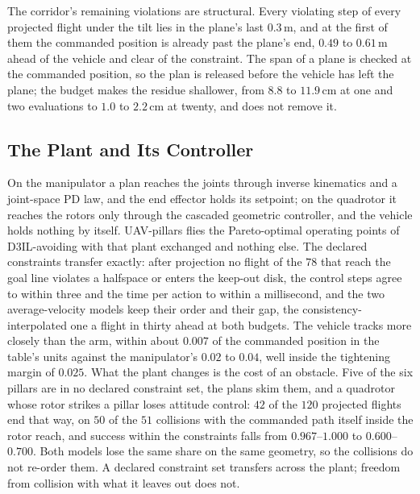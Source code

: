The corridor's remaining violations are structural. Every violating step of every projected flight
under the tilt lies in the plane's last $0.3$\,m, and at the first of them the commanded position is
already past the plane's end, $0.49$ to $0.61$\,m ahead of the vehicle and clear of the constraint. The
span of a plane is checked at the commanded position, so the plan is released before the vehicle has
left the plane; the budget makes the residue shallower, from $8.8$ to $11.9$\,cm at one and two
evaluations to $1.0$ to $2.2$\,cm at twenty, and does not remove it.

\subsection{The Plant and Its Controller}\label{sec:disc:plant}

On the manipulator a plan reaches the joints through inverse kinematics and a joint-space PD law, and
the end effector holds its setpoint; on the quadrotor it reaches the rotors only through the cascaded
geometric controller, and the vehicle holds nothing by itself. UAV-pillars flies the Pareto-optimal
operating points of D3IL-avoiding with that plant exchanged and nothing else. The declared constraints
transfer exactly: after projection no flight of the $78$ that reach the goal line violates a halfspace
or enters the keep-out disk, the control steps agree to within three and the time per action to within
a millisecond, and the two average-velocity models keep their order and their gap, the
consistency-interpolated one a flight in thirty ahead at both budgets. The vehicle tracks more closely
than the arm, within about $0.007$ of the commanded position in the table's units against the
manipulator's $0.02$ to $0.04$, well inside the tightening margin of $0.025$. What the plant changes is
the cost of an obstacle. Five of the six pillars are in no declared constraint set, the plans skim
them, and a quadrotor whose rotor strikes a pillar loses attitude control: $42$ of the $120$ projected
flights end that way, on $50$ of the $51$ collisions with the commanded path itself inside the rotor
reach, and success within the constraints falls from $0.967$--$1.000$ to $0.600$--$0.700$. Both models
lose the same share on the same geometry, so the collisions do not re-order them. A declared constraint
set transfers across the plant; freedom from collision with what it leaves out does not.

